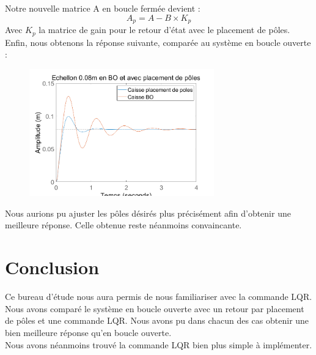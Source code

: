 \documentclass[a4paper,12pt]{insa} %
\begin{document}
Notre nouvelle matrice A en boucle fermée devient : 
$$A_p = A-B \times K_p$$
Avec $K_p$ la matrice de gain pour le retour d'état avec le placement de pôles.
Enfin, nous obtenons la réponse suivante, comparée au système en boucle ouverte : \\
 \begin{center}
    \begin{figure}[H]
        \centering
        \includegraphics[width=8cm, keepaspectratio]{figures/pp.png}
    \end{figure}
\end{center}

Nous aurions pu ajuster les pôles désirés plus précisément afin d'obtenir une meilleure réponse. Celle obtenue reste néanmoins convaincante.


\section{Conclusion}
Ce bureau d'étude nous aura permis de nous familiariser avec la commande LQR. Nous avons comparé le système en boucle ouverte avec un retour par placement de pôles et une commande LQR. Nous avons pu dans chacun des cas obtenir une bien meilleure réponse qu'en boucle ouverte.\\
Nous avons néanmoins trouvé la commande LQR bien plus simple à implémenter.  





\makefourthcover    %
\end{document}

